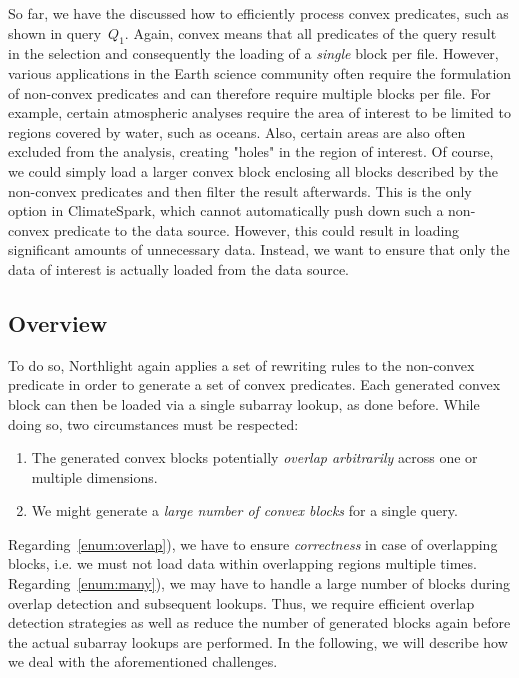 \documentclass[conference]{IEEEtran}
\newcommand{\system}{Northlight}
\begin{document}
So far, we have the discussed how to efficiently process convex predicates, such as shown in query~$Q_1$. Again, convex means that all predicates of the query result in the selection and consequently the loading of a \textit{single} block per file.
However, various applications in the Earth science community often require the formulation of non-convex predicates and can therefore require multiple blocks per file. For example, certain atmospheric analyses require the area of interest to be limited to regions covered by water, such as oceans. Also, certain areas are also often excluded from the analysis, creating "holes" in the region of interest. Of course, we could simply load a larger convex block enclosing all blocks described by the non-convex predicates and then filter the result afterwards. This is the only option in ClimateSpark, which cannot automatically push down such a non-convex predicate to the data source. However, this could result in loading significant amounts of unnecessary data. Instead, we want to ensure that only the data of interest is actually loaded from the data source. 

\subsection{Overview}

To do so, \system{} again applies a set of rewriting rules to the non-convex predicate in order to generate a set of convex predicates. Each generated convex block can then be loaded via a single subarray lookup, as done before. While doing so, two circumstances must be respected:
\begin{enumerate} 
\item \label{enum:overlap} The generated convex blocks potentially \textit{overlap arbitrarily} across one or multiple dimensions.
\item \label{enum:many} We might generate a \textit{large number of convex blocks} for a single query.
\end{enumerate}
Regarding~\ref{enum:overlap}), we have to ensure \textit{correctness} in case of overlapping blocks, i.e. we must not load data within overlapping regions multiple times. 
Regarding~\ref{enum:many}), we may have to handle a large number of blocks during overlap detection and subsequent lookups. Thus, we require efficient overlap detection strategies as well as reduce the number of generated blocks again before the actual subarray lookups are performed. 
In the following, we will describe how we deal with the aforementioned challenges.
\end{document}
